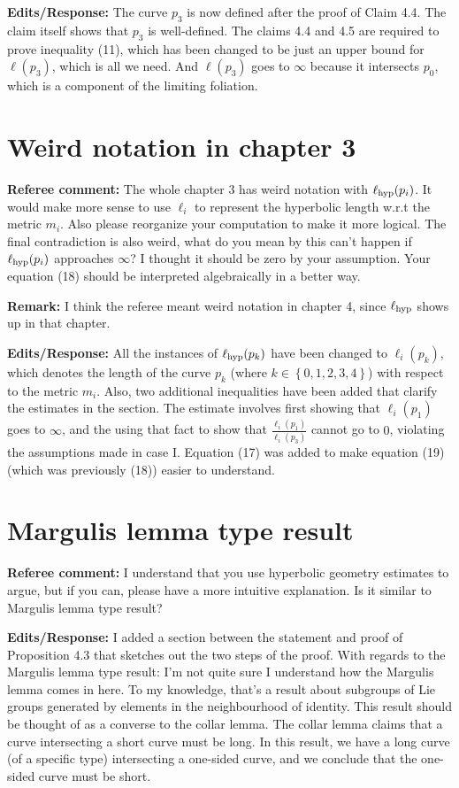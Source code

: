 \documentclass[12pt, reqno]{amsart}
\begin{document}
\textbf{Edits/Response:} The curve $p_3$ is now defined after the proof of Claim 4.4. The claim itself shows that $p_3$ is well-defined.
The claims 4.4 and 4.5 are required to prove inequality (11), which has been changed to be just an upper bound for $\ell(p_3)$, which is all we need. And $\ell(p_3)$ goes to $\infty$ because it intersects $p_0$, which is a component of the limiting foliation.

\section{Weird notation in chapter 3}
\label{sec:weird-notat-chapt}

\textbf{Referee comment:} The whole chapter 3 has weird notation with $\ell_{\mathrm{hyp}}(p_i)$. It would make more sense to use $\ell_i$ to represent the hyperbolic length w.r.t the metric $m_i$.
Also please reorganize your computation to make it more logical. The final contradiction is also weird, what do you mean by this can't happen if $\ell_{\mathrm{hyp}}(p_i)$ approaches $\infty$? I thought it should be zero by your assumption. Your equation (18) should be interpreted algebraically in a better way.

\textbf{Remark:} I think the referee meant weird notation in chapter 4, since $\ell_{\mathrm{hyp}}$ shows up in that chapter.

\textbf{Edits/Response:} All the instances of $\ell_{\mathrm{hyp}}(p_k)$ have been changed to $\ell_i(p_k)$, which denotes the length of the curve $p_k$ (where $k \in \left\{ 0, 1, 2, 3, 4 \right\}$) with respect to the metric $m_i$.
Also, two additional inequalities have been added that clarify the estimates in the section. The estimate involves first showing that $\ell_i(p_1)$ goes to $\infty$, and the using that fact to show that $\frac{\ell_i(p_1)}{\ell_i(p_3)}$ cannot go to $0$, violating the assumptions made in case I.
Equation (17) was added to make equation (19) (which was previously (18)) easier to understand.

\section{Margulis lemma type result}
\label{sec:margulis-lemma-type}

\textbf{Referee comment:} I understand that you use hyperbolic geometry estimates to argue, but if you can, please have a more intuitive explanation. Is it similar to Margulis lemma type result?

\textbf{Edits/Response:} I added a section between the statement and proof of Proposition 4.3 that sketches out the two steps of the proof.
With regards to the Margulis lemma type result: I'm not quite sure I understand how the Margulis lemma comes in here. To my knowledge, that's a result about subgroups of Lie groups generated by elements in the neighbourhood of identity.
This result should be thought of as a converse to the collar lemma.
The collar lemma claims that a curve intersecting a short curve must be long.
In this result, we have a long curve (of a specific type) intersecting a one-sided curve, and we conclude that the one-sided curve must be short.
\end{document}
